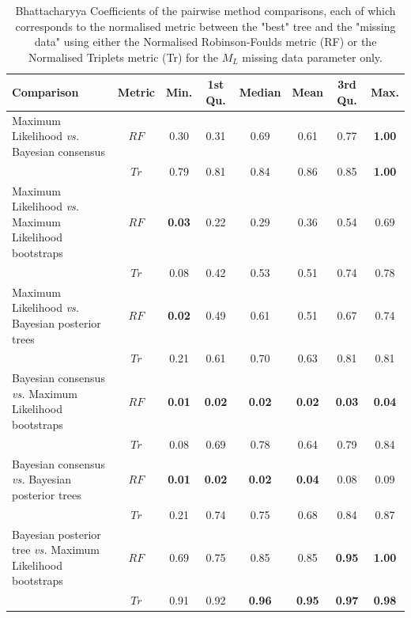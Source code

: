 \documentclass[12pt,letterpaper]{article}
\begin{document}
\begin{landscape}
\begin{table}[ht]
\caption{Bhattacharyya Coefficients of the pairwise method comparisons, each of which corresponds to the normalised metric between the "best" tree and the "missing data" using either the Normalised Robinson-Foulds metric (RF) or the Normalised Triplets metric (Tr) for the $M_{L}$ missing data parameter only.}
\label{Tab_Supp_summary_BC_ML}
\centering
\begin{tabular}{lccccccc}
  \hline
 Comparison &  Metric & Min. & 1st Qu. & Median & Mean & 3rd Qu. & Max. \\ 
  \hline
    Maximum Likelihood \textit{vs.} Bayesian consensus                 & $RF$ & 0.30 & 0.31 & 0.69 & 0.61 & 0.77 & \textbf{1.00} \\ 
                                                                       & $Tr$ & 0.79 & 0.81 & 0.84 & 0.86 & 0.85 & \textbf{1.00} \\ 
    Maximum Likelihood \textit{vs.} Maximum Likelihood bootstraps      & $RF$ & \textbf{0.03} & 0.22 & 0.29 & 0.36 & 0.54 & 0.69 \\ 
                                                                       & $Tr$ & 0.08 & 0.42 & 0.53 & 0.51 & 0.74 & 0.78 \\ 
    Maximum Likelihood \textit{vs.} Bayesian posterior trees           & $RF$ & \textbf{0.02} & 0.49 & 0.61 & 0.51 & 0.67 & 0.74 \\ 
                                                                       & $Tr$ & 0.21 & 0.61 & 0.70 & 0.63 & 0.81 & 0.81 \\ 
    Bayesian consensus \textit{vs.} Maximum Likelihood bootstraps      & $RF$ & \textbf{0.01} & \textbf{0.02} & \textbf{0.02} & \textbf{0.02} & \textbf{0.03} & \textbf{0.04} \\ 
                                                                       & $Tr$ & 0.08 & 0.69 & 0.78 & 0.64 & 0.79 & 0.84 \\ 
    Bayesian consensus \textit{vs.} Bayesian posterior trees           & $RF$ & \textbf{0.01} & \textbf{0.02} & \textbf{0.02} & \textbf{0.04} & 0.08 & 0.09 \\ 
                                                                       & $Tr$ & 0.21 & 0.74 & 0.75 & 0.68 & 0.84 & 0.87 \\ 
    Bayesian posterior tree \textit{vs.} Maximum Likelihood bootstraps & $RF$ & 0.69 & 0.75 & 0.85 & 0.85 & \textbf{0.95} & \textbf{1.00} \\ 
                                                                       & $Tr$ & 0.91 & 0.92 & \textbf{0.96} & \textbf{0.95} & \textbf{0.97} & \textbf{0.98} \\ 
   \hline
\end{tabular}
\end{table}
\end{landscape}
\end{document}
